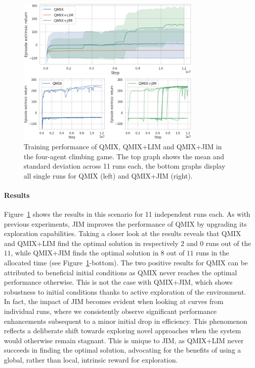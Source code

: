 \begin{figure}
    \centering
     \includegraphics[width=0.8\textwidth]{Figures/JIM/climb4R.png}
    \caption{Training performance of QMIX, QMIX+LIM and QMIX+JIM in the four-agent climbing game. The top graph shows the mean and standard deviation across 11 runs each, the bottom graphs display all single runs for QMIX (left) and QMIX+JIM (right).}
    \label{fig:JIM:climb4_results}
\end{figure}

\paragraph{Results} Figure~\ref{fig:JIM:climb4_results} shows the results in this scenario for 11 independent runs each. As with previous experiments, JIM improves the performance of QMIX by upgrading its exploration capabilities. Taking a closer look at the results reveals that QMIX and QMIX+LIM find the optimal solution in respectively $2$ and $0$ runs out of the $11$, while QMIX+JIM finds the optimal solution in $8$ out of $11$ runs in the allocated time (see Figure~\ref{fig:JIM:climb4_results}-bottom).  
The two positive results for QMIX can be attributed to beneficial initial conditions as QMIX never reaches the optimal performance otherwise. This is not the case with QMIX+JIM, which shows robustness to initial conditions thanks to active exploration of the environment. In fact, the impact of JIM becomes evident when looking at curves from individual runs, where we consistently observe significant performance enhancements subsequent to a minor initial drop in efficiency. This phenomenon reflects a deliberate shift towards exploring novel approaches when the system would otherwise remain stagnant. This is unique to JIM, as  QMIX+LIM never succeeds in finding the optimal solution, advocating for the benefits of using a global, rather than local, intrinsic reward for exploration. 





